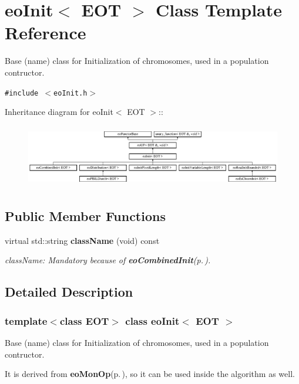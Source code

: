 \section{eo\-Init$<$ EOT $>$ Class Template Reference}
\label{classeo_init}
Base (name) class for Initialization of chromosomes, used in a population contructor.  


{\tt \#include $<$eo\-Init.h$>$}

Inheritance diagram for eo\-Init$<$ EOT $>$::\begin{figure}[H]
\begin{center}
\leavevmode
\includegraphics[height=2.78607cm]{classeo_init}
\end{center}
\end{figure}
\subsection*{Public Member Functions}
\begin{CompactItemize}
\item 
virtual std::string {\bf class\-Name} (void) const 
\begin{CompactList}\small\item\em class\-Name: Mandatory because of {\bf eo\-Combined\-Init}{\rm (p.\,\pageref{classeo_combined_init})}. \item\end{CompactList}\end{CompactItemize}


\subsection{Detailed Description}
\subsubsection*{template$<$class EOT$>$ class eo\-Init$<$ EOT $>$}

Base (name) class for Initialization of chromosomes, used in a population contructor. 

It is derived from {\bf eo\-Mon\-Op}{\rm (p.\,\pageref{classeo_mon_op})}, so it can be used inside the algorithm as well.

